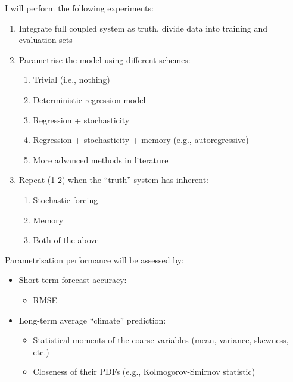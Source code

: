 \documentclass[12pt, aspectratio=169]{beamer}
\begin{document}
\begin{frame}{I will perform the following experiments:}
\begin{enumerate}
    \item<1-> Integrate full coupled system as truth, divide data into training
        and evaluation sets
    \item<2-> Parametrise the model using different schemes:
    \begin{enumerate}
        \item Trivial (i.e., nothing)
        \item Deterministic regression model
        \item Regression + stochasticity
        \item Regression + stochasticity + memory (e.g., autoregressive)
        \item More advanced methods in literature
    \end{enumerate}
    \item<3-> Repeat (1-2) when the ``truth'' system has inherent:
    \begin{enumerate}
        \item Stochastic forcing
        \item Memory
        \item Both of the above
    \end{enumerate}
\end{enumerate}
\end{frame}

\begin{frame}{Parametrisation performance will be assessed by:}
\begin{itemize}
    \item Short-term forecast accuracy:
    \begin{itemize}
        \item RMSE
    \end{itemize}
    \item Long-term average ``climate'' prediction:
    \begin{itemize}
        \item Statistical moments of the coarse variables (mean, variance,
            skewness, etc.)
        \item Closeness of their PDFs (e.g., Kolmogorov-Smirnov statistic)
    \end{itemize}
\end{itemize}
\end{frame}
\end{document}
